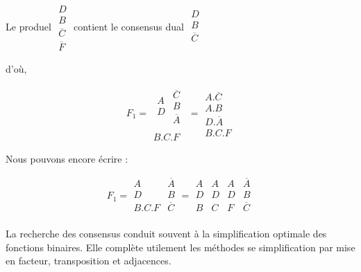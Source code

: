 Le produel $ \begin{array}{|c|} D \\ B \\ \overline{C} \\ \overline{F} \end{array} $  contient le consensus dual $\begin{array}{|c|} D \\ B \\ \overline{C} \\ \end{array} $


d'où, 

\[ 
F_1 = \begin{array}{|c|} 
         \begin{array}{c} A \\ D \\\end{array} \begin{array}{|c} \overline{C} \\ B \\ \overline{A} \\ \end{array} \\
         B . C . F  
 \end{array} = \begin{array}{|l|} A . \overline{C} \\ A . B \\ D . \overline{A}  \\ B . C . F \end{array} 
\] 

Nous pouvons encore écrire : 

\[
F_1 = \begin{array}{|c|c|} A & \overline{A}\\ D & B \\ B . C . F & \overline{C}\\ \end{array} 
    = \begin{array}{|c|c|c|c|} A & A & A & \overline{A} \\ D & D & D & B \\ B & C & F & \overline{C}\\\end{array}  
\] 



La recherche des consensus conduit souvent à la simplification optimale des fonctions binaires. Elle complète utilement les méthodes se simplification par mise en facteur, transposition et adjacences. 

